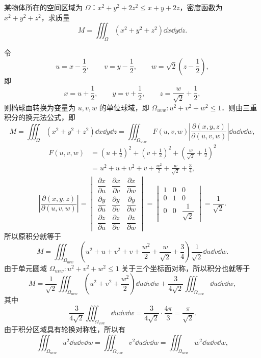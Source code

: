 某物体所在的空间区域为 $\Omega$：$x^2+y^2+2z^2\le x+y+2z$，密度函数为 $x^2+y^2+z^2$，求质量
\[
  M=\iiint_\Omega \left(x^2+y^2+z^2\right)\dd x\dd y\dd z.
\]
\begin{solution}
  令
  \[
    u=x-\frac{1}{2},\qquad v=y-\frac{1}{2},\qquad w=\sqrt{2}\left(z-\frac{1}{2}\right),
  \]
  即
  \[
    x=u+\frac{1}{2},\qquad y=v+\frac{1}{2},\qquad z=\frac{w}{\sqrt{2}}+\frac{1}{2},
  \]
  则椭球面转换为变量为 $u,v,w$ 的单位球域，即 $\Omega_{uvw}:u^2+v^2+w^2\le 1$．则由三重积分的换元法公式，即
  \[
    M=\iiint_\Omega \left(x^2+y^2+z^2\right)\dd x\dd y\dd z
     =\iiint_{\Omega_{uvw}}F(u,v,w)\left|\frac{\partial(x,y,z)}{\partial(u,v,w)}\right|\dd u\dd v\dd w,
  \]
  \begin{align*}
    F(u,v,w)&=\left(u+\frac{1}{2}\right)^2+\left(v+\frac{1}{2}\right)^2+\left(\frac{w}{\sqrt{2}}+\frac{1}{2}\right)^2\\
    &=u^2+u+v^2+v+\frac{w^2}{2}+\frac{w}{\sqrt{2}}+\frac{3}{4},
  \end{align*}
  \[
    \left|\frac{\partial(x,y,z)}{\partial(u,v,w)}\right|
    =\begin{vmatrix}
      \dfrac{\partial x}{\partial u} & \dfrac{\partial x}{\partial v} & \dfrac{\partial x}{\partial w}\\[2ex]
      \dfrac{\partial y}{\partial u} & \dfrac{\partial y}{\partial v} & \dfrac{\partial y}{\partial w}\\[2ex]
      \dfrac{\partial z}{\partial u} & \dfrac{\partial z}{\partial v} & \dfrac{\partial z}{\partial w}
    \end{vmatrix}
    =\begin{vmatrix}
      1 & 0 & 0\\
      0 & 1 & 0\\
      0 & 0 & \dfrac{1}{\sqrt{2}}
    \end{vmatrix}
    =\frac{1}{\sqrt{2}}.
  \]
  所以原积分就等于
  \[
    M=\iiint_{\Omega_{uvw}}\left(u^2+u+v^2+v+\frac{w^2}{2}+\frac{w}{\sqrt{2}}+\frac{3}{4}\right)\frac{1}{\sqrt{2}}\dd u\dd v\dd w.
  \]
  由于单元圆域 $\Omega_{uvw}:u^2+v^2+w^2\le 1$ 关于三个坐标面对称，所以积分也就等于
  \[
    M=\frac{1}{\sqrt{2}}\iiint_{\Omega_{uvw}}\left(u^2+v^2+\frac{w^2}{2}\right)\dd u\dd v\dd w
     +\frac{3}{4\sqrt{2}}\iiint_{\Omega_{uvw}}\dd u\dd v\dd w,
  \]
  其中
  \[
    \frac{3}{4\sqrt{2}}\iiint_{\Omega_{uvw}}\dd u\dd v\dd w=\frac{3}{4\sqrt{2}}\cdot\frac{4\pi}{3}=\frac{\pi}{\sqrt{2}}.
  \]
  由于积分区域具有轮换对称性，所以有
  \[
    \iiint_{\Omega_{uvw}}u^2\dd u\dd v\dd w=\iiint_{\Omega_{uvw}}v^2\dd u\dd v\dd w=\iiint_{\Omega_{uvw}}w^2\dd u\dd v\dd w,
\]
\end{solution}
